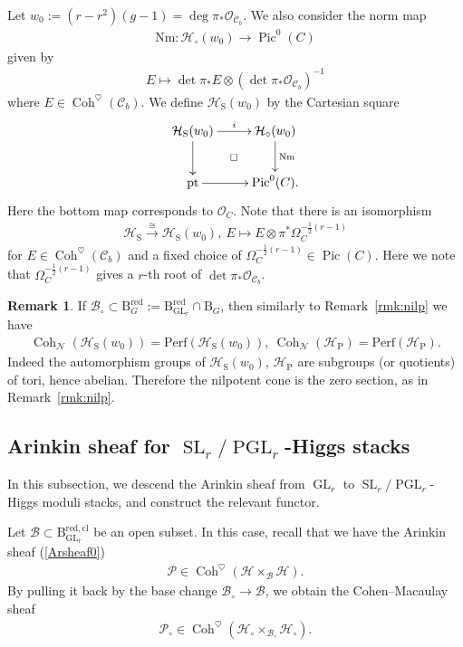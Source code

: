 \documentclass[11pt,oneside,a4paper,mathscr]{amsart}
\makeatletter
\theoremstyle{definition}
\newtheorem{remark}[thm]{Remark}
\newcommand{\Pic}{\operatorname{Pic}}
\newcommand{\cH}{\mathcal{H}}
\newcommand{\cB}{\mathcal{B}}
\newcommand{\cC}{\mathcal{C}}
\newcommand{\cP}{\mathcal{P}}
\newcommand{\cO}{\mathcal{O}}
\newcommand{\diasquare}{\ar@{}[rd]|\square}
\newcommand{\rB}{\mathrm{B}}
\newcommand{\Coh}{\operatorname{Coh}}
\newcommand{\GL}{\operatorname{GL}}
\newcommand{\SL}{\operatorname{SL}}
\newcommand{\PGL}{\operatorname{PGL}}
\newcommand{\rS}{\mathrm{S}}
\newcommand{\rP}{\mathrm{P}}
\makeatother
\begin{document}
Let $w_0:=(r-r^2)(g-1)=\deg \pi_{*}\cO_{\cC_b}$. We also consider the norm map 
\begin{align}\label{def:norm}
    \mathrm{Nm} \colon \cH_{\circ}(w_0)\to \Pic^0(C)
\end{align}
given by 
\begin{align*}
    E \mapsto \det \pi_{*}E \otimes (\det \pi_{*}\mathcal{O}_{\cC_b})^{-1}
\end{align*}
where $E\in \Coh^{\heartsuit}(\cC_b)$. 
We define $\cH_{\rS}(w_0)$ by the Cartesian square 
\begin{align*}
    \xymatrix{
\cH_{\rS}(w_0) \ar[r]^-{i} \ar[d] \diasquare & \cH_{\circ}(w_0) \ar[d]^-{\mathrm{Nm}} \\
\mathrm{pt} \ar[r] & \Pic^0(C).
    }
\end{align*}
Here the bottom map corresponds to $\mathcal{O}_C$. 
Note that there is an isomorphism 
\begin{align}\label{isom:norm}
\cH_{\rS} \stackrel{\cong}{\to}\cH_{\rS}(w_0), \ E \mapsto E\otimes \pi^{*}\Omega_C^{-\frac{1}{2}(r-1)}
\end{align}
for $E\in \Coh^{\heartsuit}(\cC_b)$ and a fixed choice of 
$\Omega_C^{-\frac{1}{2}(r-1)}\in \Pic(C)$. Here 
we note that $\Omega_C^{-\frac{1}{2}(r-1)}$ gives a $r$-th root of 
$\det \pi_{*}\cO_{\cC_b}$. 
\begin{remark}\label{rmk:perfSP}
If $\cB_{\circ} \subset \rB_{G}^{\mathrm{red}}:=\rB_{\GL_r}^{\mathrm{red}} \cap \rB_{G}$, 
then similarly to Remark~\ref{rmk:nilp} we have 
\begin{align*}
    \Coh_{\mathcal{N}}(\cH_{\rS}(w_0))=\mathrm{Perf}(\cH_{\rS}(w_0)), \ 
    \Coh_{\mathcal{N}}(\cH_{\rP})=\mathrm{Perf}(\cH_{\rP}).
\end{align*}
   Indeed the automorphism groups of $\cH_{\rS}(w_0)$, $\cH_{\rP}$ are 
   subgroups (or quotients) of tori, hence abelian. Therefore the nilpotent cone is the 
   zero section, as in Remark~\ref{rmk:nilp}. 
\end{remark}
\subsection[Arinkin sheaf for SLr/PGLr-Higgs stacks]{Arinkin sheaf for \texorpdfstring{$\SL_r/\PGL_r$}{SLr/PGLr}-Higgs stacks}
In this subsection, we descend the Arinkin sheaf from $\GL_r$ to 
$\SL_r/\PGL_r$-Higgs moduli stacks, and construct the relevant functor. 

Let $\cB \subset \rB_{\GL_r}^{\mathrm{red, cl}}$ be an open subset. 
In this case, recall that we have the Arinkin sheaf (\ref{Arsheaf0})
\begin{align*}
    \cP \in \Coh^{\heartsuit}(\cH\times_{\cB}\cH).
\end{align*}
By pulling it back by the base change 
$\cB_{\circ} \to \cB$, we obtain the Cohen--Macaulay sheaf 
\begin{align*}
    \cP_{\circ} \in \Coh^{\heartsuit}(\cH_{\circ}\times_{\cB_{\circ}}\cH_{\circ}). 
\end{align*}
\end{document}
